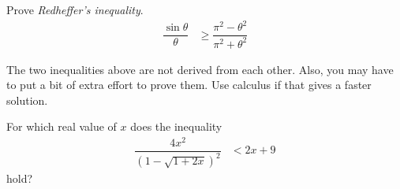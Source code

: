 \documentclass{subfile}
\begin{document}
		\begin{problem}
			Prove \emph{Redheffer's inequality}.
				\begin{align*}
					\dfrac{\sin{\theta}}{\theta}
						& \geq\dfrac{\pi^2-\theta^2}{\pi^2+\theta^2}
				\end{align*}
		\end{problem}
	The two inequalities above are not derived from each other. Also, you may have to put a bit of extra effort to prove them. Use calculus if that gives a faster solution.
		\begin{problem}[IMO $1960$]
			For which real value of $x$ does the inequality
				\begin{align*}
					\dfrac{4x^2}{(1-\sqrt{1+2x})^2}
						& <2x+9
				\end{align*}
			hold?
		\end{problem}
\end{document}
